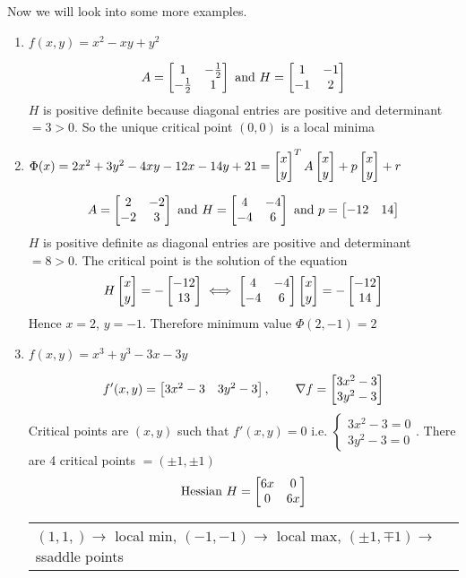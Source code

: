 Now we will look into some more examples.
\begin{enumerate}[label=\bfseries\tiny\protect\circled{\small\arabic*}]
	\item $f(x,y)=x^2-xy+y^2$
	
	$$A=\left[ \begin{matrix}
		1 & -\frac12\\ -\frac12 & 1
	\end{matrix} \right]\text{ and }H=\left[ \begin{matrix}
	1 & -1\\ -1 & 2
\end{matrix} \right]$$ $H$ is  positive definite because diagonal entries are positive and determinant $ =3>0$. So the unique critical point $(0,0)$ is a local minima

\item $\Phi(x)=2x^2+3y^2-4xy-12x-14y+21=\left[\begin{matrix}x\\y\end{matrix}\right]^TA\left[\begin{matrix}x\\ y\end{matrix}\right]+p\left[\begin{matrix}x\\ y\end{matrix}\right]+r$

$$A=\left[\begin{matrix}2& -2\\ -2 & 3\end{matrix}\right]\text{ and }H=\left[\begin{matrix}4 & -4\\ -4 & 6\end{matrix}\right]\text{ and }p=\left[\begin{matrix} -12 & 14\end{matrix}\right]$$ $H$ is positive definite as diagonal entries are positive and determinant $=8>0$. The critical point is the solution of the equation $$H\left[\begin{matrix}x\\ y\end{matrix}\right] = - \left[\begin{matrix} -12 \\ 13\end{matrix}\right] \iff \left[\begin{matrix}4 & -4\\ -4 & 6\end{matrix}\right]\left[\begin{matrix}x\\ y\end{matrix}\right]=-\left[\begin{matrix}-12\\ 14\end{matrix}\right]$$Hence $x=2$, $y=-1$. Therefore minimum value $\Phi(2,-1)=2$
\item $f(x,y)=x^3+y^3-3x-3y$

$$f'(x,y)=\left[\begin{matrix}3x^2-3 & 3y^2-3\end{matrix}\right], \qquad \nabla f=\left[\begin{matrix}3x^2-3\\ 3y^2-3\end{matrix}\right]$$Critical points are $(x,y)$ such that $f'(x,y)=0$ i.e. $\begin{cases}
	3x^2-3=0\\ 3y^2-3=0
\end{cases}$. There are 4 critical points $=(\pm 1, \pm 1)$ $$\text{Hessian }H=\left[\begin{matrix}6x & 0\\ 0 & 6x\end{matrix}\right]$$ \begin{center}
\begin{tabular}{l}
	$(1,1,)\to$ local min, 	$(-1,-1)\to$ local max, $(\pm 1,\mp 1)\to$ ssaddle points
\end{tabular}
\end{center}
 \end{enumerate}
